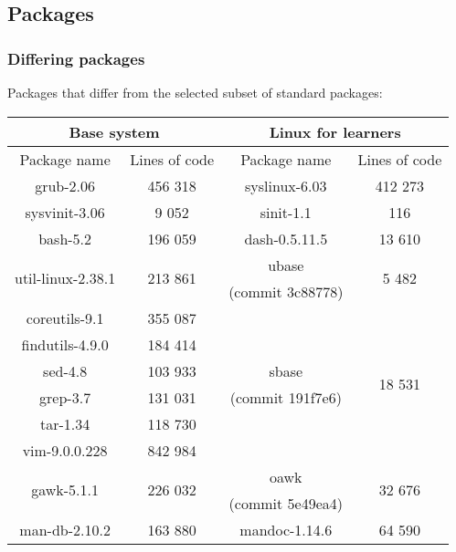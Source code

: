 \subsection{Packages}\label{Packages}

\subsubsection{Differing packages}

Packages that differ from the selected subset of standard packages:

\begin{center}
    \begin{tabular}{|c|c||c|c|}
        \hline
        \multicolumn{2}{|c||}{Base system} & \multicolumn{2}{|c|}{Linux for learners} \\
        \hline
        \hline
        Package name & Lines of code & Package name & Lines of code \\
        \hline
        \hline
        grub-2.06 & 456 318 & syslinux-6.03 & 412 273 \\
        \hline
        sysvinit-3.06 & 9 052 & sinit-1.1 & 116 \\
        \hline
        bash-5.2 & 196 059 & dash-0.5.11.5 & 13 610 \\
        \hline
        \multirow{2}{*}{util-linux-2.38.1} & \multirow{2}{*}{213 861} & ubase & \multirow{2}{*}{5 482} \\
        & & (commit 3c88778) & \\
        \hline
        coreutils-9.1 & 355 087 & & \multirow{6}{*}{18 531} \\
        findutils-4.9.0 & 184 414 & & \\
        sed-4.8 & 103 933 & sbase & \\
        grep-3.7 & 131 031 & (commit 191f7e6) & \\
        tar-1.34 & 118 730 & & \\
        vim-9.0.0.228 & 842 984 & & \\
        \hline
        \multirow{2}{*}{gawk-5.1.1} & \multirow{2}{*}{226 032} & oawk & \multirow{2}{*}{32 676} \\
        & & (commit 5e49ea4) & \\
        \hline
        man-db-2.10.2 & 163 880 & mandoc-1.14.6 & 64 590 \\
        \hline
    \end{tabular}
\end{center}

